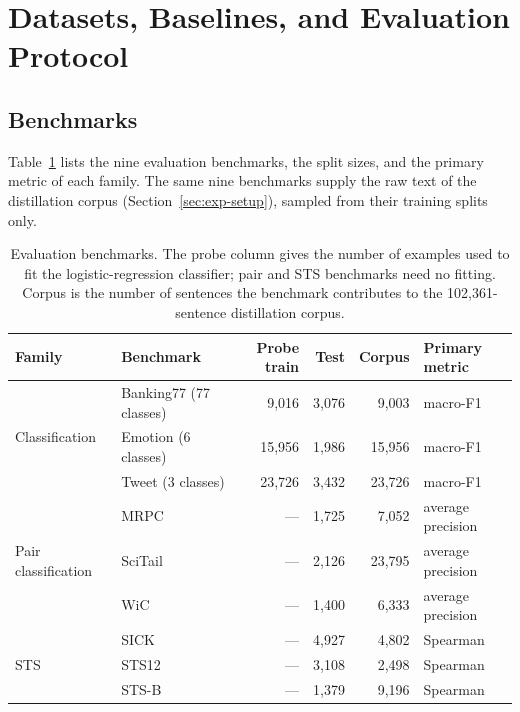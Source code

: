 \section{Datasets, Baselines, and Evaluation Protocol}
\label{app:evaluation}

\subsection{Benchmarks}
\label{app:benchmarks}

Table~\ref{tab:benchmarks} lists the nine evaluation benchmarks, the split
sizes, and the primary metric of each family. The same nine benchmarks supply
the raw text of the distillation corpus (Section~\ref{sec:exp-setup}), sampled
from their training splits only.

\begin{table}[h]
    \caption{Evaluation benchmarks. The probe column gives the number of
    examples used to fit the logistic-regression classifier; pair and STS
    benchmarks need no fitting. Corpus is the number of sentences the benchmark
    contributes to the 102{,}361-sentence distillation corpus.}
    \label{tab:benchmarks}
    \vspace{0.5em}
    \centering
    \small
    \begin{tabular}{@{}llrrrl@{}}
        \toprule
        Family & Benchmark & Probe train & Test & Corpus & Primary metric \\
        \midrule
        \multirow{3}{*}{Classification}
          & Banking77 (77 classes) & 9{,}016 & 3{,}076 & 9{,}003 & macro-F1 \\
          & Emotion (6 classes)    & 15{,}956 & 1{,}986 & 15{,}956 & macro-F1 \\
          & Tweet (3 classes)      & 23{,}726 & 3{,}432 & 23{,}726 & macro-F1 \\
        \midrule
        \multirow{3}{*}{Pair classification}
          & MRPC    & --- & 1{,}725 & 7{,}052 & average precision \\
          & SciTail & --- & 2{,}126 & 23{,}795 & average precision \\
          & WiC     & --- & 1{,}400 & 6{,}333 & average precision \\
        \midrule
        \multirow{3}{*}{STS}
          & SICK  & --- & 4{,}927 & 4{,}802 & Spearman \\
          & STS12 & --- & 3{,}108 & 2{,}498 & Spearman \\
          & STS-B & --- & 1{,}379 & 9{,}196 & Spearman \\
        \bottomrule
    \end{tabular}
\end{table}

